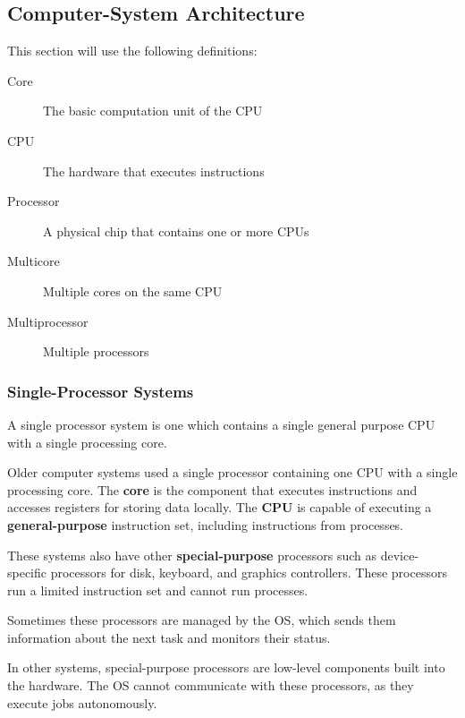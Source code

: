 \documentclass{article}
\begin{document}
\subsection{Computer-System Architecture}

\begin{tcolorboxlarge}[title={Definitions}, parbox=false]
    This section will use the following definitions:
    \begin{description}
        \item[Core] The basic computation unit of the CPU
        \item[CPU] The hardware that executes instructions
        \item[Processor] A physical chip that contains one or more CPUs
        \item[Multicore] Multiple cores on the same CPU
        \item[Multiprocessor] Multiple processors
    \end{description}
\end{tcolorboxlarge}

\subsubsection{Single-Processor Systems}
A single processor system is one which contains a single general purpose CPU with a single processing core.

Older computer systems used a single processor containing one CPU with a single processing core.
The \textbf{core} is the component that executes instructions and accesses registers for storing data locally.
The \textbf{CPU} is capable of executing a \textbf{general-purpose} instruction set, including instructions from
processes.

These systems also have other \textbf{special-purpose} processors such as device-specific processors for
disk, keyboard, and graphics controllers. These processors run a limited instruction set and
cannot run processes.

Sometimes these processors are managed by the OS, which sends them
information about the next task and monitors their status.

In other systems, special-purpose processors are low-level components built into the hardware.
The OS cannot communicate with these processors, as they execute jobs autonomously.
\end{document}
